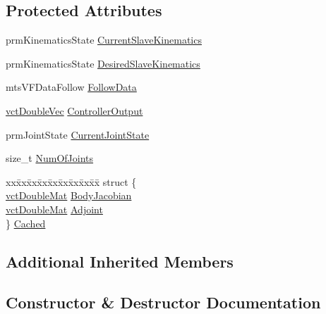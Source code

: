 \subsection*{Protected Attributes}
\begin{DoxyCompactItemize}
\item 
prm\+Kinematics\+State \hyperlink{classmts_intuitive_research_kit_optimizer_a10517be9e248c92c46501f6eea30433c}{Current\+Slave\+Kinematics}
\item 
prm\+Kinematics\+State \hyperlink{classmts_intuitive_research_kit_optimizer_a095ebf16dfbac51a8d8c24830824b856}{Desired\+Slave\+Kinematics}
\item 
mts\+V\+F\+Data\+Follow \hyperlink{classmts_intuitive_research_kit_optimizer_a08aabafa6727fbfa54b229e0faa21bdf}{Follow\+Data}
\item 
\hyperlink{vct_dynamic_vector_types_8h_ade4b3068c86fb88f41af2e5187e491c2}{vct\+Double\+Vec} \hyperlink{classmts_intuitive_research_kit_optimizer_ac33e4d294b5b6abee6863f070b477c42}{Controller\+Output}
\item 
prm\+Joint\+State \hyperlink{classmts_intuitive_research_kit_optimizer_ad436ec7283125c4598fcb243f0354e29}{Current\+Joint\+State}
\item 
size\+\_\+t \hyperlink{classmts_intuitive_research_kit_optimizer_aa64f574f639972c9ef2ce46db04c48f6}{Num\+Of\+Joints}
\item 
\begin{tabbing}
xx\=xx\=xx\=xx\=xx\=xx\=xx\=xx\=xx\=\kill
struct \{\\
\>\hyperlink{vct_dynamic_matrix_types_8h_a48f1eb2461d20a99e824ee5753a37c84}{vctDoubleMat} \hyperlink{classmts_intuitive_research_kit_optimizer_abfe8527a15da180a73c60e761ac889bb}{BodyJacobian}\\
\>\hyperlink{vct_dynamic_matrix_types_8h_a48f1eb2461d20a99e824ee5753a37c84}{vctDoubleMat} \hyperlink{classmts_intuitive_research_kit_optimizer_a84bd5de92e87e58310b54fa83fe8faf3}{Adjoint}\\
\} \hyperlink{classmts_intuitive_research_kit_optimizer_afadd58c5ceab477317cd3b39d6f247fa}{Cached}\\

\end{tabbing}\end{DoxyCompactItemize}
\subsection*{Additional Inherited Members}


\subsection{Constructor \& Destructor Documentation}
\hypertarget{classmts_intuitive_research_kit_optimizer_af160a886afc7ade0e09a70492774604d}{}
